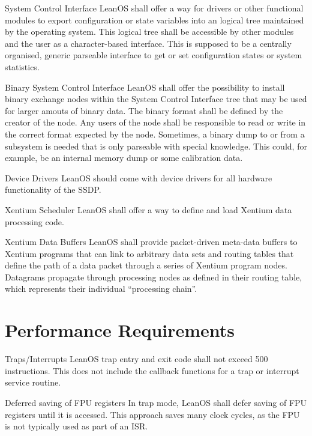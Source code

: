  {System Control Interface}{%
LeanOS shall offer a way for drivers or other functional modules to export
configuration or state variables into an logical tree maintained by
the operating system. This logical tree shall be accessible by other modules and
the user as a character-based interface.
}{%
This is supposed to be a centrally organised, generic parseable interface to
get or set configuration states or system statistics.
}%

 {Binary System Control Interface}{%
LeanOS shall offer the possibility to install binary exchange nodes within the
System Control Interface tree that may be used for larger amouts of binary data.
The binary format shall be defined by the creator of the node. Any users of the
node shall be responsible to read or write in the correct format expected by the
node.%
}{%
Sometimes, a binary dump to or from a subsystem is needed that is only parseable
with special knowledge. This could, for example, be an internal memory dump or
some calibration data.
}%

 {Device Drivers}{%
LeanOS should come with device drivers for all hardware functionality of the SSDP.
}{}%

 {Xentium Scheduler}{%
LeanOS shall offer a way to define and load Xentium data processing code.
}{}%

 {Xentium Data Buffers}{%
LeanOS shall provide packet-driven meta-data buffers to Xentium programs that
can link to arbitrary data sets and routing tables that define the path of
a data packet through a series of Xentium program nodes.
}{%
Datagrams propagate through processing nodes as defined in their routing table,
which represents their individual ``processing chain''.}%


\section{Performance Requirements}

 {Traps/Interrupts}{%
LeanOS trap entry and exit code shall not exceed 500 instructions.
}{%
This does not include the callback functions for a trap or interrupt
service routine.
}%

 {Deferred saving of \gls{FPU} registers}{%
In trap mode, LeanOS shall defer saving of \gls{FPU} registers until it is
accessed.
}{%
This approach saves many clock cycles, as the \gls{FPU} is not typically used
as part of an \gls{ISR}.
}%


